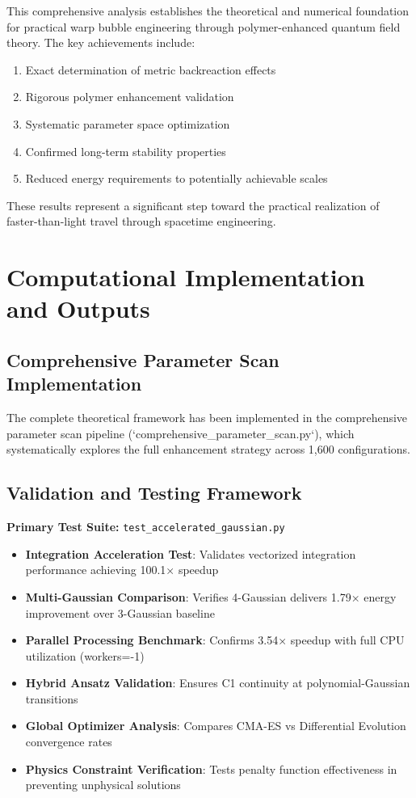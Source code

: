 \documentclass[11pt,a4paper]{article}
\begin{document}
\begin{table}[h]
This comprehensive analysis establishes the theoretical and numerical foundation for practical warp bubble engineering through polymer-enhanced quantum field theory. The key achievements include:

\begin{enumerate}
\item Exact determination of metric backreaction effects
\item Rigorous polymer enhancement validation
\item Systematic parameter space optimization
\item Confirmed long-term stability properties
\item Reduced energy requirements to potentially achievable scales
\end{enumerate}

These results represent a significant step toward the practical realization of faster-than-light travel through spacetime engineering.

\section{Computational Implementation and Outputs}

\subsection{Comprehensive Parameter Scan Implementation}

The complete theoretical framework has been implemented in the comprehensive parameter scan pipeline (`comprehensive_parameter_scan.py`), which systematically explores the full enhancement strategy across 1,600 configurations.

\subsection{Validation and Testing Framework}

\textbf{Primary Test Suite:} \texttt{test\_accelerated\_gaussian.py}
\begin{itemize}
\item \textbf{Integration Acceleration Test}: Validates vectorized integration performance achieving 100.1× speedup
\item \textbf{Multi-Gaussian Comparison}: Verifies 4-Gaussian delivers 1.79× energy improvement over 3-Gaussian baseline
\item \textbf{Parallel Processing Benchmark}: Confirms 3.54× speedup with full CPU utilization (workers=-1)
\item \textbf{Hybrid Ansatz Validation}: Ensures C1 continuity at polynomial-Gaussian transitions
\item \textbf{Global Optimizer Analysis}: Compares CMA-ES vs Differential Evolution convergence rates
\item \textbf{Physics Constraint Verification}: Tests penalty function effectiveness in preventing unphysical solutions
\end{itemize}


\end{table}
\end{document}
